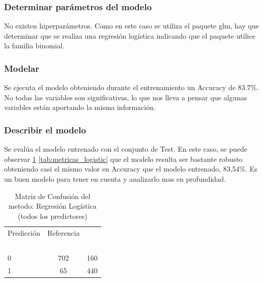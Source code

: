 \subsubsection{Determinar parámetros del modelo}
No existen hiperparámetros. Como en este caso se utiliza el paquete glm,
hay que determinar que se realiza una regresión logística indicando
que el paquete utilice la familia binomial.


\subsubsection{Modelar}

Se ejecuta el modelo obteniendo durante el entrenamiento un Accuracy de 83.7\%.\\

No todas las variables son significativas, lo que
nos lleva a pensar que algunas variables están aportando la misma información.



\subsubsection{Describir el modelo}


Se evalúa el modelo entrenado con el conjunto de Test. En este caso, se
puede observar \ref{tab:MatrizConf_logistic} \ref{tab:metricas_logistic} que el modelo resulta ser bastante robusto obteniendo
casi el mismo valor en Accuracy que el modelo entrenado, 83,54\%. Es un
buen modelo para tener en cuenta y analizarlo mas en profundidad.

\begin{table}[!h]
	
	\caption{\label{tab:MatrizConf_logistic}Matriz de Confusión del metodo: Regresión Logística (todos los predictores) }
	\centering
	\begin{tabular}[t]{lcc}
		\toprule
		\multicolumn{1}{c}{Predicción} & \multicolumn{1}{c}{Referencia} & \multicolumn{1}{c}{ } \\
		\cmidrule(l{3pt}r{3pt}){1-1} \cmidrule(l{3pt}r{3pt}){2-2}
		\rowcolor{black}  \multicolumn{1}{c}{\textcolor{white}{\textbf{ }}} & \multicolumn{1}{c}{\textcolor{white}{\textbf{0}}} & \multicolumn{1}{c}{\textcolor{white}{\textbf{1}}}\\
		\midrule
		\rowcolor{gray!6}  0 & 702 & 160\\
		1 & 65 & 440\\
		\bottomrule
	\end{tabular}
\end{table}

